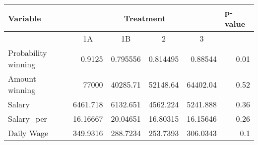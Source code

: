 \begin{tabular}{lrrrrr}
\toprule
Variable & \multicolumn{4}{c}{Treatment} & \multicolumn{1}{l}{p-value} \\
\midrule
\midrule
      & \multicolumn{1}{c}{1A} & \multicolumn{1}{c}{1B} & \multicolumn{1}{c}{2} & \multicolumn{1}{c}{3} &  \\
\midrule
Probability winning & 0.9125 & 0.795556 & 0.814495 & 0.88544 & 0.01 \\
Amount winning & 77000 & 40285.71 & 52148.64 & 64402.04 & 0.52 \\
Salary & 6461.718 & 6132.651 & 4562.224 & 5241.888 & 0.36 \\
Salary\_per & 16.16667 & 20.04651 & 16.80315 & 16.15646 & 0.26 \\
Daily Wage & 349.9316 & 288.7234 & 253.7393 & 306.0343 & 0.1 \\
\end{tabular}%
